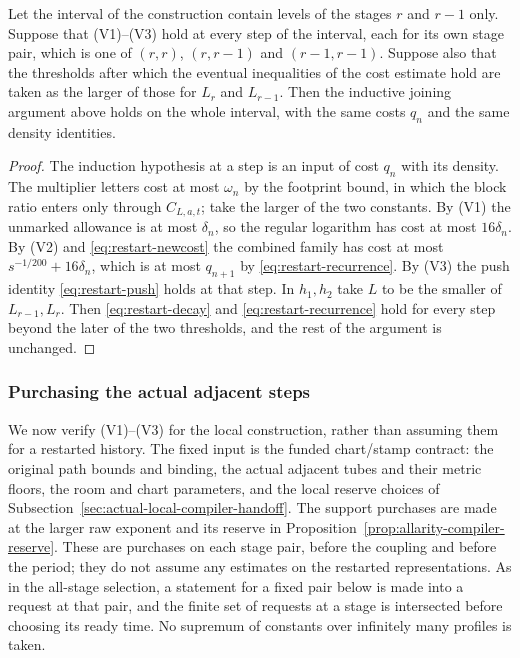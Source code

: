 \begin{lemma}
\label{lem:restart-stage-boundary}
Let the interval of the construction contain levels of the stages $r$ and
$r-1$ only. Suppose that (V1)--(V3) hold at every step of the interval,
each for its own stage pair, which is one of $(r,r)$, $(r,r-1)$ and
$(r-1,r-1)$. Suppose also that the thresholds after which the eventual
inequalities of the cost estimate hold are taken as the larger of those
for $L_r$ and $L_{r-1}$. Then the inductive joining argument above holds
on the whole interval, with the same costs $q_n$ and the same density
identities.
\end{lemma}
\begin{proof}
The induction hypothesis at a step is an input of cost $q_n$ with its
density. The multiplier letters cost at most $\omega_n$ by the footprint
bound, in which the block ratio enters only through $C_{L,a,t}$; take the
larger of the two constants. By (V1) the unmarked allowance is at most
$\delta_n$, so the regular logarithm has cost at most $16\delta_n$. By (V2)
and \eqref{eq:restart-newcost} the combined family has cost at most
$s^{-1/200}+16\delta_n$, which is at most $q_{n+1}$ by
\eqref{eq:restart-recurrence}. By (V3) the push identity
\eqref{eq:restart-push} holds at that step. In $h_1,h_2$ take $L$ to be the
smaller of $L_{r-1},L_r$. Then \eqref{eq:restart-decay} and
\eqref{eq:restart-recurrence} hold for every step beyond the later of the
two thresholds, and the rest of the argument is unchanged.
\end{proof}

\subsubsection{Purchasing the actual adjacent steps}
\label{subsec:restart-actual-purchases}

We now verify (V1)--(V3) for the local construction, rather than
assuming them for a restarted history. The fixed input is the funded
chart/stamp contract: the original path bounds and binding, the actual
adjacent tubes and their metric floors, the room and chart parameters,
and the local reserve choices of
Subsection~\ref{sec:actual-local-compiler-handoff}. The support purchases
are made at the larger raw exponent and its reserve in
Proposition~\ref{prop:allarity-compiler-reserve}. These are purchases
on each stage pair, before the coupling and before the period; they do
not assume any estimates on the restarted representations. As in the
all-stage selection, a statement for a fixed pair below is made into a
request at that pair, and the finite set of requests at a stage is
intersected before choosing its ready time. No supremum of constants
over infinitely many profiles is taken.

